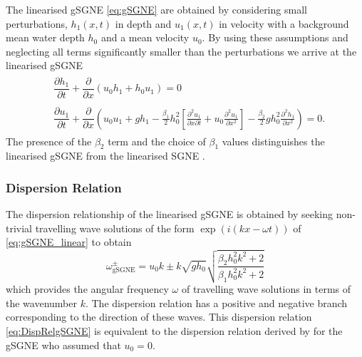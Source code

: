 \documentclass[10pt]{elsarticle}
\begin{document}
The linearised gSGNE \eqref{eq:gSGNE} are obtained by considering small perturbations, $h_1(x,t)$ in depth and $u_1(x,t)$ in velocity with a background mean water depth $h_0$ and a mean velocity $u_0$. By using these assumptions and neglecting all terms significantly smaller than the perturbations we arrive at the linearised gSGNE
\begin{subequations}
\begin{align}
\begin{split}
&\dfrac{\partial h_1}{\partial t} + \dfrac{\partial }{\partial x} \left( u_0 h_1 +  h_0 u_1 \right) = 0
\label{eq:gSGNE_linear_h}
\end{split} \\
\begin{split}
&\dfrac{\partial u_1}{\partial t}  + \dfrac{\partial }{\partial x} \left( u_0u_1+ g  h_1 -\frac{\beta_1}{2}h_0^2\left[\frac{\partial^2 u_1}{\partial x \partial t} + u_0\frac{\partial^2 u_1}{\partial x^2} \right]  - \frac{\beta_2}{2} g h_0^2\frac{\partial^2 h_1}{\partial x^2}\right) = 0.
\label{eq:gSGNE_linear_uh}
\end{split}
\end{align}
\label{eq:gSGNE_linear}
\end{subequations}
The presence of the $\beta_2$ term and the choice of $\beta_1$ values distinguishes the linearised gSGNE from the linearised SGNE \cite{Zoppou-etal-2017}.


\subsubsection{Dispersion Relation}
The dispersion relationship of the linearised gSGNE is obtained by seeking non-trivial travelling wave solutions of the form $\exp\left(i (k x - \omega t)\right)$ of \eqref{eq:gSGNE_linear} to obtain
\begin{equation}
\omega^\pm_\text{gSGNE} = u_0 k \pm k \sqrt{gh_0} \sqrt{\dfrac{\beta_2 h_0^2 k^2 + 2}{\beta_1 h_0^2 k^2 + 2} }
\label{eq:DispRelgSGNE}
\end{equation}
which provides the angular frequency $\omega$ of travelling wave solutions in terms of the wavenumber $k$. The dispersion relation has a positive and negative branch corresponding to the direction of these waves. This dispersion relation \eqref{eq:DispRelgSGNE} is equivalent to the dispersion relation derived by \citet{Clamond-Dutykh-2018-237} for the gSGNE who assumed that $u_0 = 0$. 
\end{document}
